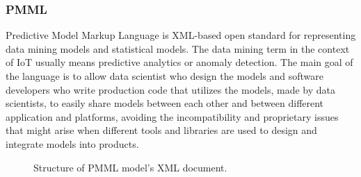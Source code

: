 \documentclass[english, 12pt, a4paper, elec, utf8, online]{aaltothesis}
\begin{document}
\subsubsection{PMML}
Predictive Model Markup Language is XML-based open standard for representing data mining models and statistical models. The data mining term in the context of IoT usually means predictive analytics or anomaly detection. The main goal of the language is to allow data scientist who design the models and software developers who write production code that utilizes the models, made by data scientists, to easily share models between each other and between different application and platforms, avoiding the incompatibility and proprietary issues that might arise when different tools and libraries are used to design and integrate models into products.~\cite{guazzelli2009pmml}

\begin{figure}[h!]
\centering
{}
\caption{Structure of PMML model's XML document.}\label{fig:pmml_struct}
\end{figure}
\end{document}
